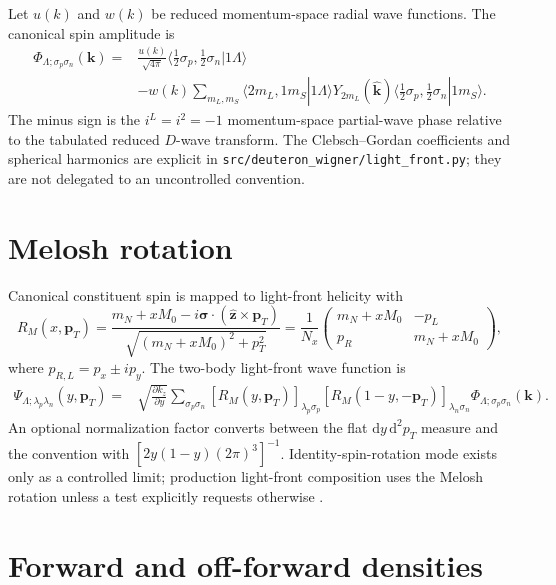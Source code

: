 \documentclass[11pt,oneside]{book}
\newcommand{\pT}{\bm{p}_{T}}
\newcommand{\dd}{\mathrm{d}}
\newcommand{\codepath}[1]{\nolinkurl{#1}}
\begin{document}
Let $u(k)$ and $w(k)$ be reduced momentum-space radial wave functions.  The canonical spin amplitude is
\begin{align}
 \Phi_{\Lambda;\sigma_p\sigma_n}(\bm k)
 ={}&\frac{u(k)}{\sqrt{4\pi}}
 \langle\tfrac12\sigma_p,\tfrac12\sigma_n|1\Lambda\rangle
 \nonumber\\
 &-w(k)\sum_{m_L,m_S}
 \langle2m_L,1m_S|1\Lambda\rangle
 Y_{2m_L}(\widehat{\bm k})
 \langle\tfrac12\sigma_p,\tfrac12\sigma_n|1m_S\rangle.
 \label{eq:canonical-SD}
\end{align}
The minus sign is the $i^L=i^2=-1$ momentum-space partial-wave phase relative to the tabulated reduced $D$-wave transform.  The Clebsch--Gordan coefficients and spherical harmonics are explicit in \codepath{src/deuteron_wigner/light_front.py}; they are not delegated to an uncontrolled convention.

\section{Melosh rotation}

Canonical constituent spin is mapped to light-front helicity with
\begin{equation}
 R_M(x,\pT)
 =\frac{m_N+xM_0-i\bm\sigma\cdot(\widehat{\bm z}\times\pT)}
 {\sqrt{(m_N+xM_0)^2+p_T^2}}
 =\frac{1}{N_x}
 \begin{pmatrix}
 m_N+xM_0&-p_L\\
 p_R&m_N+xM_0
 \end{pmatrix},
 \label{eq:melosh}
\end{equation}
where $p_{R,L}=p_x\pm ip_y$.  The two-body light-front wave function is
\begin{align}
 \Psi_{\Lambda;\lambda_p\lambda_n}(y,\pT)
 ={}&\sqrt{\frac{\partial k_z}{\partial y}}
 \sum_{\sigma_p\sigma_n}
 [R_M(y,\pT)]_{\lambda_p\sigma_p}
 [R_M(1-y,-\pT)]_{\lambda_n\sigma_n}
 \Phi_{\Lambda;\sigma_p\sigma_n}(\bm k).
 \label{eq:lfwf}
\end{align}
An optional normalization factor converts between the flat $\dd y\,\dd^2p_T$ measure and the convention with $[2y(1-y)(2\pi)^3]^{-1}$.  Identity-spin-rotation mode exists only as a controlled limit; production light-front composition uses the Melosh rotation unless a test explicitly requests otherwise \cite{Carbonell1998,Miller2000LF,CookeMiller2002}.

\section{Forward and off-forward densities}
\end{document}
